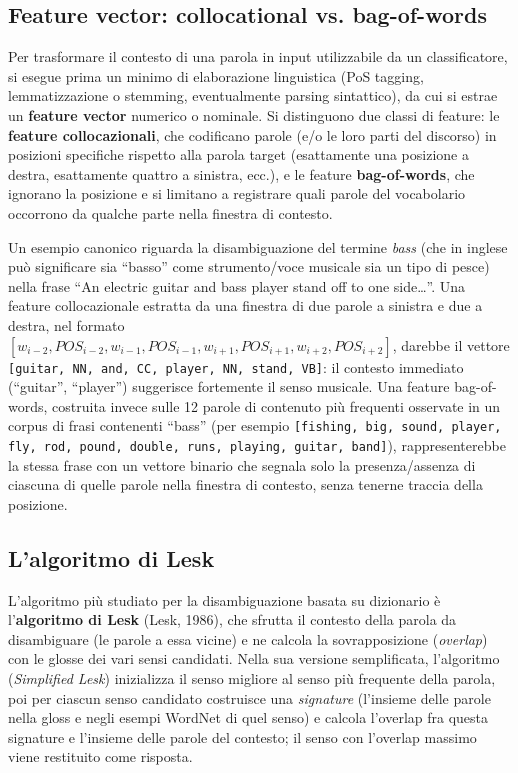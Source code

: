 \documentclass[11pt,a4paper]{report}
\begin{document}
\subsection{Feature vector: collocational vs. bag-of-words}

Per trasformare il contesto di una parola in input utilizzabile da un classificatore, si esegue prima un minimo di elaborazione linguistica (PoS tagging, lemmatizzazione o stemming, eventualmente parsing sintattico), da cui si estrae un \textbf{feature vector} numerico o nominale. Si distinguono due classi di feature: le \textbf{feature collocazionali}, che codificano parole (e/o le loro parti del discorso) in posizioni specifiche rispetto alla parola target (esattamente una posizione a destra, esattamente quattro a sinistra, ecc.), e le feature \textbf{bag-of-words}, che ignorano la posizione e si limitano a registrare quali parole del vocabolario occorrono da qualche parte nella finestra di contesto.

Un esempio canonico riguarda la disambiguazione del termine \emph{bass} (che in inglese può significare sia ``basso'' come strumento/voce musicale sia un tipo di pesce) nella frase ``An electric guitar and bass player stand off to one side\ldots''. Una feature collocazionale estratta da una finestra di due parole a sinistra e due a destra, nel formato $[w_{i-2},POS_{i-2},w_{i-1},POS_{i-1},w_{i+1},POS_{i+1},w_{i+2},POS_{i+2}]$, darebbe il vettore \texttt{[guitar, NN, and, CC, player, NN, stand, VB]}: il contesto immediato (``guitar'', ``player'') suggerisce fortemente il senso musicale. Una feature bag-of-words, costruita invece sulle 12 parole di contenuto più frequenti osservate in un corpus di frasi contenenti ``bass'' (per esempio \texttt{[fishing, big, sound, player, fly, rod, pound, double, runs, playing, guitar, band]}), rappresenterebbe la stessa frase con un vettore binario che segnala solo la presenza/assenza di ciascuna di quelle parole nella finestra di contesto, senza tenerne traccia della posizione.

\subsection{L'algoritmo di Lesk}

L'algoritmo più studiato per la disambiguazione basata su dizionario è l'\textbf{algoritmo di Lesk} (Lesk, 1986), che sfrutta il contesto della parola da disambiguare (le parole a essa vicine) e ne calcola la sovrapposizione (\emph{overlap}) con le glosse dei vari sensi candidati. Nella sua versione semplificata, l'algoritmo (\emph{Simplified Lesk}) inizializza il senso migliore al senso più frequente della parola, poi per ciascun senso candidato costruisce una \emph{signature} (l'insieme delle parole nella gloss e negli esempi WordNet di quel senso) e calcola l'overlap fra questa signature e l'insieme delle parole del contesto; il senso con l'overlap massimo viene restituito come risposta.
\end{document}
